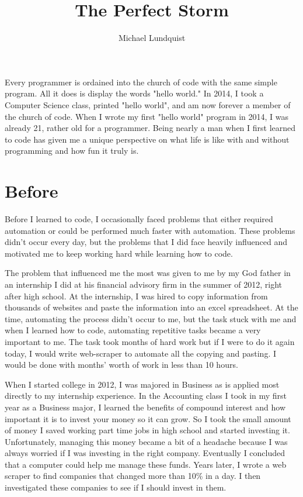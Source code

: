 \documentclass[titlepage]{article}
\author{Michael Lundquist}
\title{The Perfect Storm}
\begin{document}
\maketitle


Every programmer is ordained into the church of code with the same simple program. All it does is display the words "hello world." In 2014, I took a Computer Science class, printed "hello world", and am now forever a member of the church of code. When I wrote my first "hello world" program in 2014, I was already 21, rather old for a programmer. Being nearly a man when I first learned to code has given me a unique perspective on what life is like with and without programming and how fun it truly is.

\section{Before}

Before I learned to code, I occasionally faced problems that either required automation or could be performed much faster with automation. These problems didn't occur every day, but the problems that I did face heavily influenced and motivated me to keep working hard while learning how to code.


The problem that influenced me the most was given to me by my God father in an internship I did at his financial advisory firm in the summer of 2012, right after high school. At the internship, I was hired to copy information from thousands of websites and paste the information into an excel spreadsheet. At the time, automating the process didn't occur to me, but the task stuck with me and when I learned how to code, automating repetitive tasks became a very important to me. The task took months of hard work but if I were to do it again today, I would write web-scraper to automate all the copying and pasting. I would be done with months' worth of work in less than 10 hours.

When I started college in 2012, I was majored in Business as is applied most directly to my internship experience. In the Accounting class I took in my first year as a Business major, I learned the benefits of compound interest and how important it is to invest your money so it can grow. So I took the small amount of money I saved working part time jobs in high school and started investing it. Unfortunately, managing this money became a bit of a headache because I was always worried if I was investing in the right company. Eventually I concluded that a computer could help me manage these funds. Years later, I wrote a web scraper to find companies that changed more than 10\% in a day. I then investigated these companies to see if I should invest in them.
\end{document}
